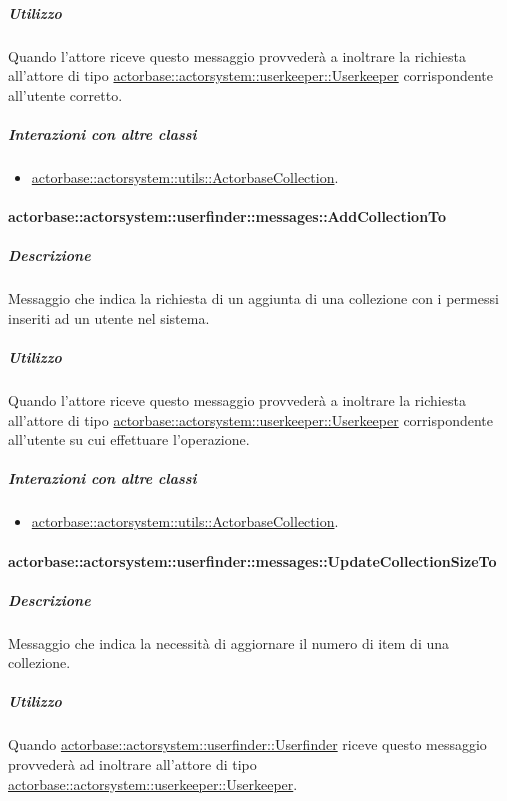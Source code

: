 \documentclass{scalatekids-article}
\begin{document}
\subparagraph{Utilizzo}
Quando l'attore riceve questo messaggio provvederà a inoltrare la richiesta
all'attore di tipo \hyperref[sec:actorbase::actorsystem::userkeeper::Userkeeper]{actorbase::\allowbreak{}actorsystem::\allowbreak{}userkeeper::\allowbreak{}Userkeeper}
corrispondente all'utente corretto.

\subparagraph{Interazioni con altre classi}
\begin{itemize}
\item \hyperref[sec:actorbase::actorsystem::utils::ActorbaseCollection]{actorbase::actorsystem::utils::ActorbaseCollection}.
\end{itemize}

\paragraph{actorbase::actorsystem::userfinder::messages::AddCollectionTo}
\label{sec:actorbase::actorsystem::userfinder::messages::AddCollectionTo}

\subparagraph{Descrizione}
Messaggio che indica la richiesta di un aggiunta di una collezione con i permessi inseriti ad un utente nel sistema.

\subparagraph{Utilizzo}
Quando l'attore riceve questo messaggio provvederà a inoltrare la richiesta all'attore di tipo \hyperref[sec:actorbase::actorsystem::userkeeper::Userkeeper]{actorbase::\allowbreak{}actorsystem::\allowbreak{}userkeeper::\allowbreak{}Userkeeper}
corrispondente all'utente su cui effettuare l'operazione.

\subparagraph{Interazioni con altre classi}
\begin{itemize}
\item \hyperref[sec:actorbase::actorsystem::utils::ActorbaseCollection]{actorbase::actorsystem::utils::ActorbaseCollection}.
\end{itemize}

\paragraph{actorbase::actorsystem::userfinder::messages::UpdateCollectionSizeTo}
\label{sec:actorbase::actorsystem::userfinder::messages::UpdateCollectionSizeTo}

\subparagraph{Descrizione}

Messaggio che indica la necessità di aggiornare il numero di item di una collezione.

\subparagraph{Utilizzo}

Quando \hyperref[sec:actorbase::actorsystem::userfinder::Userfinder]{actorbase::\allowbreak{}actorsystem::\allowbreak{}userfinder::\allowbreak{}Userfinder}
riceve questo messaggio provvederà ad inoltrare all'attore di tipo
\hyperref[sec:actorbase::actorsystem::userkeeper::Userkeeper]{actorbase::\allowbreak{}actorsystem::\allowbreak{}userkeeper::\allowbreak{}Userkeeper}.
\end{document}
